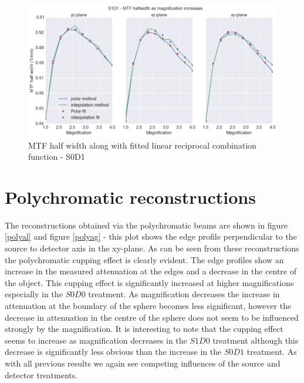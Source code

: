 \documentclass[
  twoside,
  11pt, a4paper,
  footinclude=true,
  headinclude=true,
  cleardoublepage=empty
]{scrbook}
\begin{document}
\begin{figure}[h!]
  \centering
    \includegraphics[width=\textwidth]{code/MTF_and_PSF/MTF_Interp_Polar_Plots_files/MTF_Interp_Polar_Plots_8_1.png}
    \caption{MTF half width along with fitted linear reciprocal combination function - S0D1}
        \label{S1D1half}
\end{figure}





\section{Polychromatic reconstructions}

The reconstructions obtained via the polychromatic beams are shown in figure \ref{polyal} and figure \ref{polyag} - this plot shows the edge profile perpendicular to the source to detector axis in the xy-plane. As can be seen from these reconstructions the polychromatic cupping effect is clearly evident. The edge profiles show an increase in the measured attenuation at the edges and a decrease in the centre of the object. This cupping effect is significantly increased at higher magnifications especially in the $S0D0$ treatment. As magnification decreases the increase in attenuation at the boundary of the sphere becomes less significant, however the decrease in attenuation in the centre of the sphere does not seem to be influenced strongly by the magnification. It is interesting to note that the cupping effect seems to increase as magnification decreases in the $S1D0$ treatment although this decrease is significantly less obvious than the increase in the $S0D1$ treatment. As with all previous results we again see competing influences of the source and detector treatments.
\end{document}
